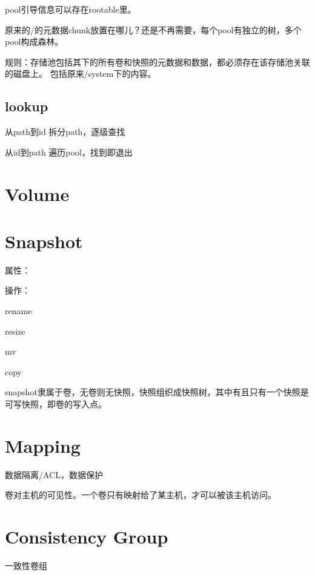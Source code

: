pool引导信息可以存在rootable里。

原来的/的元数据chunk放置在哪儿？还是不再需要，每个pool有独立的树，多个pool构成森林。

规则：存储池包括其下的所有卷和快照的元数据和数据，都必须存在该存储池关联的磁盘上。
包括原来/system下的内容。

\subsection{lookup}

\begin{compactitem}
\item 从path到id 拆分path，逐级查找
\item 从id到path 遍历pool，找到即退出
\end{compactitem}

\section{Volume}

\section{Snapshot}
属性：

操作：
\begin{compactenum}
\item rename
\item resize 
\item mv
\item copy   %
\end{compactenum}


snapshot隶属于卷，无卷则无快照，快照组织成快照树，其中有且只有一个快照是可写快照，即卷的写入点。

\section{Mapping}

数据隔离/ACL，数据保护

卷对主机的可见性。一个卷只有映射给了某主机，才可以被该主机访问。


\section{Consistency Group}

一致性卷组

